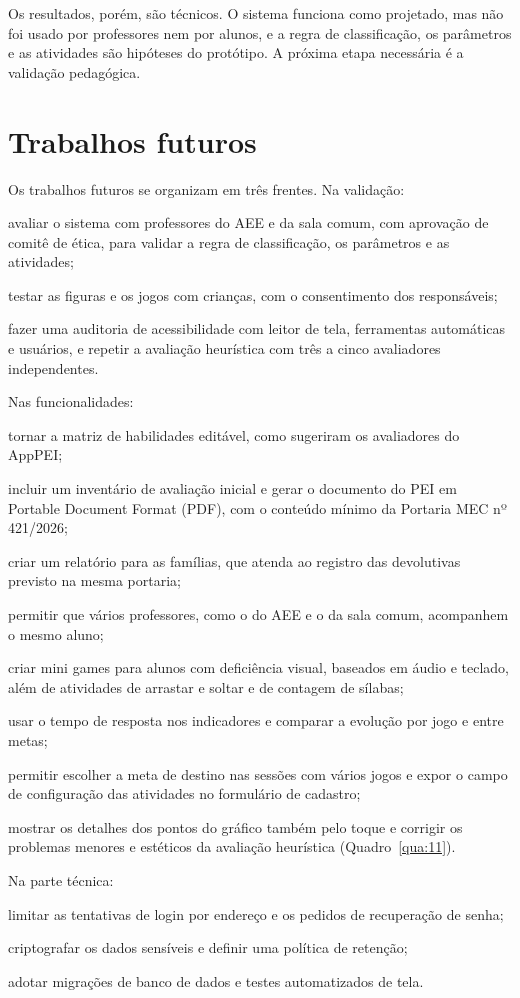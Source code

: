 Os resultados, porém, são técnicos. O sistema funciona como projetado, mas não foi usado por professores nem por alunos, e a regra de classificação, os parâmetros e as atividades são hipóteses do protótipo. A próxima etapa necessária é a validação pedagógica.

\section{Trabalhos futuros}\label{sec:6.1}

Os trabalhos futuros se organizam em três frentes. Na validação:

\begin{alineasIFTO}
  \item avaliar o sistema com professores do AEE e da sala comum, com aprovação de comitê de ética, para validar a regra de classificação, os parâmetros e as atividades;
  \item testar as figuras e os jogos com crianças, com o consentimento dos responsáveis;
  \item fazer uma auditoria de acessibilidade com leitor de tela, ferramentas automáticas e usuários, e repetir a avaliação heurística com três a cinco avaliadores independentes.
\end{alineasIFTO}

Nas funcionalidades:

\begin{alineasIFTO}
  \item tornar a matriz de habilidades editável, como sugeriram os avaliadores do AppPEI;
  \item incluir um inventário de avaliação inicial e gerar o documento do PEI em Portable Document Format (PDF), com o conteúdo mínimo da Portaria MEC nº 421/2026;
  \item criar um relatório para as famílias, que atenda ao registro das devolutivas previsto na mesma portaria;
  \item permitir que vários professores, como o do AEE e o da sala comum, acompanhem o mesmo aluno;
  \item criar mini games para alunos com deficiência visual, baseados em áudio e teclado, além de atividades de arrastar e soltar e de contagem de sílabas;
  \item usar o tempo de resposta nos indicadores e comparar a evolução por jogo e entre metas;
  \item permitir escolher a meta de destino nas sessões com vários jogos e expor o campo de configuração das atividades no formulário de cadastro;
  \item mostrar os detalhes dos pontos do gráfico também pelo toque e corrigir os problemas menores e estéticos da avaliação heurística (Quadro~\ref{qua:11}).
\end{alineasIFTO}

Na parte técnica:

\begin{alineasIFTO}
  \item limitar as tentativas de login por endereço e os pedidos de recuperação de senha;
  \item criptografar os dados sensíveis e definir uma política de retenção;
  \item adotar migrações de banco de dados e testes automatizados de tela.
\end{alineasIFTO}
